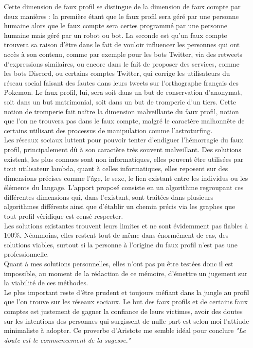 \documentclass[12pt]{report}
\begin{document}
Cette dimension de faux profil se distingue de la dimension de faux compte par deux manières : la première étant que le faux profil sera géré par une personne humaine alors que le faux compte sera certes programmé par une personne humaine mais géré par un robot ou bot. La seconde est qu'un faux compte trouvera sa raison d'être dans le fait de vouloir influencer les personnes qui ont accès à son contenu, comme par exemple pour les bots Twitter, via des retweets d'expressions similaires, ou encore dans le fait de proposer des services, comme les bots Discord, ou certains comptes Twitter, qui corrige les utilisateurs du réseau social faisant des fautes dans leurs tweets sur l'orthographe français des Pokemon. Le faux profil, lui, sera soit dans un but de conservation d'anonymat, soit dans un but matrimonial, soit dans un but de tromperie d'un tiers. Cette notion de tromperie fait naître la dimension malveillante du faux profil, notion que l'on ne trouvera pas dans le faux compte, malgré le caractère malhonnête de certains utilisant des processus de manipulation comme l'astroturfing.\\

Les réseaux sociaux luttent pour pouvoir tenter d'endiguer l'hémorragie du faux profil, principalement dû à son caractère très souvent malveillant. Des solutions existent, les plus connues sont non informatiques, elles peuvent être utilisées par tout utilisateur lambda, quant à celles informatiques, elles reposent sur des dimensions précises comme l'âge, le sexe, le lien existant entre les individus ou les éléments du langage. L'apport proposé consiste en un algorithme regroupant ces différentes dimensions qui, dans l'existant, sont traitées dans plusieurs algorithmes différents ainsi que d'établir un chemin précis via les graphes que tout profil véridique est censé respecter.\\

Les solutions existantes trouvent leurs limites et ne sont évidemment pas fiables à 100\%. Néanmoins, elles restent tout de même dans énormément de cas, des solutions viables, surtout si la personne à l'origine du faux profil n'est pas une professionnelle.\\
Quant à mes solutions personnelles, elles n'ont pas pu être testées donc il est impossible, au moment de la rédaction de ce mémoire, d'émettre un jugement sur la viabilité de ces méthodes. \\

Le plus important reste d'être prudent et toujours méfiant dans la jungle au profil que l'on trouve sur les réseaux sociaux. Le but des faux profils et de certains faux comptes est justement de gagner la confiance de leurs victimes, avoir des doutes sur les intentions des personnes qui surgissent de nulle part est selon moi l'attiude minimaliste à adopter. Ce proverbe d'Aristote me semble idéal pour conclure \textit {"Le doute est le commencement de la sagesse."}

\nocite{*}
\printbibliography
\end{document}
